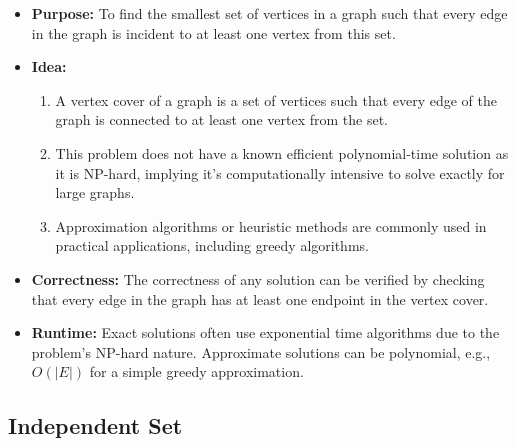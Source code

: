 \documentclass[landscape,7pt]{extarticle}
\begin{document}
\begin{multicols*}{3}
\begin{itemize}
    \item \textbf{Purpose:} To find the smallest set of vertices in a graph such that every edge in the graph is incident to at least one vertex from this set.
    \item \textbf{Idea:}
    \begin{enumerate}
        \item A vertex cover of a graph is a set of vertices such that every edge of the graph is connected to at least one vertex from the set.
        \item This problem does not have a known efficient polynomial-time solution as it is NP-hard, implying it's computationally intensive to solve exactly for large graphs.
        \item Approximation algorithms or heuristic methods are commonly used in practical applications, including greedy algorithms.
    \end{enumerate}
    \item \textbf{Correctness:} The correctness of any solution can be verified by checking that every edge in the graph has at least one endpoint in the vertex cover.
    \item \textbf{Runtime:} Exact solutions often use exponential time algorithms due to the problem's NP-hard nature. Approximate solutions can be polynomial, e.g., $O(|E|)$ for a simple greedy approximation.
\end{itemize}

\subsection*{Independent Set}


\end{multicols*}
\end{document}
